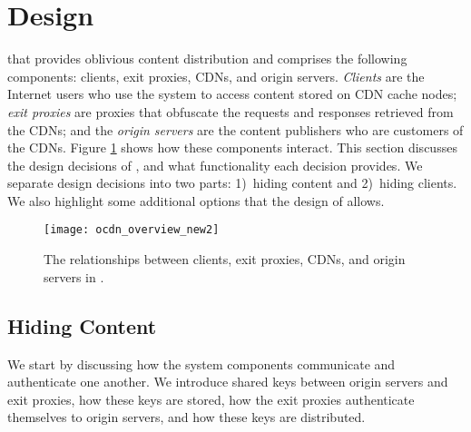 \section{\system{} Design}
\label{sec:design}

\system{} that provides oblivious content distribution and  
comprises the following components: clients, exit proxies, CDNs, and origin 
servers.  {\em Clients} are the Internet users who use the system to access content
stored on CDN cache nodes; {\em exit proxies} are proxies that obfuscate the requests
and responses retrieved from the CDNs; and the {\em origin servers} are the content
publishers who are customers of the CDNs.  Figure \ref{fig:ocd_overview} shows how
these components interact.  This section discusses the design decisions of \system{}, and what functionality each decision provides.  
We separate design decisions into two parts: 1)~hiding content and 2)~hiding clients.  We also highlight some additional options that the design of 
\system{} allows.

\begin{figure}[t!]
\centering
\texttt{[image: ocdn\_overview\_new2]}
\caption{The relationships between clients, exit proxies, CDNs, and origin servers in 
\system{}.}
\label{fig:ocd_overview}
\end{figure}

\subsection{Hiding Content}
\label{sec:hiding_content}

We start by discussing how the system components communicate and authenticate one another. 
We introduce shared keys between origin servers and exit proxies, how these keys
are stored, how the exit proxies authenticate themselves to origin servers, and how these 
keys are distributed.


